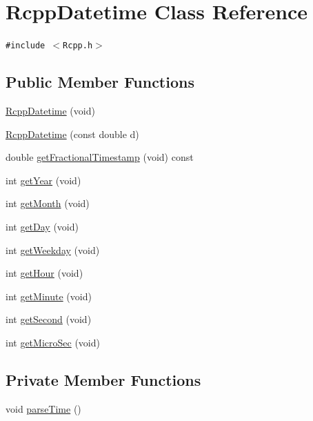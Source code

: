 \hypertarget{classRcppDatetime}{
\section{RcppDatetime Class Reference}
\label{classRcppDatetime}
}
{\tt \#include $<$Rcpp.h$>$}

\subsection*{Public Member Functions}
\begin{CompactItemize}
\item 
\hyperlink{classRcppDatetime_5a1679444e775781bf038553ef3b04ae}{RcppDatetime} (void)
\item 
\hyperlink{classRcppDatetime_43972d46cd15e6cb666d61f13bdc31f2}{RcppDatetime} (const double d)
\item 
double \hyperlink{classRcppDatetime_cb74d27387c0d851414e20d30354ac62}{getFractionalTimestamp} (void) const 
\item 
int \hyperlink{classRcppDatetime_ba930a8d7d575eb10444258a442027cf}{getYear} (void)
\item 
int \hyperlink{classRcppDatetime_a7f04947d2a27e4bba2d19efa21771ed}{getMonth} (void)
\item 
int \hyperlink{classRcppDatetime_23e9f09bef162e1ffef0e43f8a446b77}{getDay} (void)
\item 
int \hyperlink{classRcppDatetime_796802561fa8bb87a8e2a1836afaaa58}{getWeekday} (void)
\item 
int \hyperlink{classRcppDatetime_0da8db1ecd235a6e7ab309e70e4e93b0}{getHour} (void)
\item 
int \hyperlink{classRcppDatetime_db41bd524ead66d69e129b1f2767358a}{getMinute} (void)
\item 
int \hyperlink{classRcppDatetime_2feb900005890d183cc5f6a626c4d614}{getSecond} (void)
\item 
int \hyperlink{classRcppDatetime_cdf9e19f28c84fde38c352df5f225999}{getMicroSec} (void)
\end{CompactItemize}
\subsection*{Private Member Functions}
\begin{CompactItemize}
\item 
void \hyperlink{classRcppDatetime_a4b2eba45c4c02b5d334dd89e080b660}{parseTime} ()
\end{CompactItemize}
